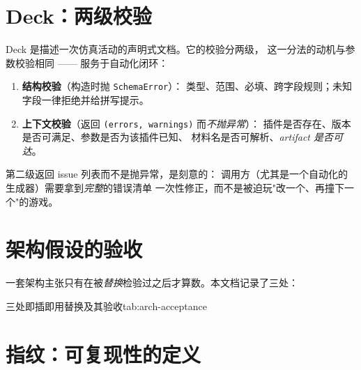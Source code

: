 \section{Deck：两级校验}
\label{sec:arch-deck}

Deck 是描述一次仿真活动的声明式文档。它的校验分两级，
这一分法的动机与参数校验相同 —— 服务于自动化闭环：

\begin{enumerate}[leftmargin=1.9em,itemsep=0.35em,topsep=0.4em]
  \item \textbf{结构校验}（构造时抛 \texttt{SchemaError}）：
        类型、范围、必填、跨字段规则；未知字段一律拒绝并给拼写提示。
  \item \textbf{上下文校验}（返回 \texttt{(errors, warnings)} 而\emph{不抛异常}）：
        插件是否存在、版本是否可满足、参数是否为该插件已知、
        材料名是否可解析、\emph{artifact 是否可达}。
\end{enumerate}

第二级返回 issue 列表而不是抛异常，是刻意的：
调用方（尤其是一个自动化的生成器）需要拿到\emph{完整}的错误清单
一次性修正，而不是被迫玩"改一个、再撞下一个"的游戏。

\section{架构假设的验收}
\label{sec:arch-acceptance}

一套架构主张只有在被\emph{替换}检验过之后才算数。本文档记录了三处：

\begin{veriftable}{三处即插即用替换及其验收}{tab:arch-acceptance}
\end{veriftable}

\section{指纹：可复现性的定义}
\label{sec:arch-fingerprint}

